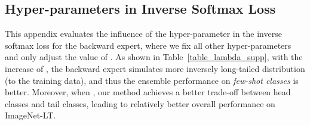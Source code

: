 \documentclass{article}
\begin{document}
\begin{table}[h]  
	\caption{Performance of our method with different numbers of experts   on  various      test class distributions  of ImageNet-LT.} 
	\label{table_agnostic_expert_number_supp} 
 \begin{center}
 \begin{threeparttable} 
	 \end{threeparttable}
	 \end{center}  
\end{table} 


 \newpage
\subsection{Hyper-parameters in Inverse Softmax Loss}
This appendix evaluates the influence of the hyper-parameter  in the   inverse softmax loss for the backward expert, where we fix all other hyper-parameters and only adjust the value of  . 
As shown in Table~\ref{table_lambda_supp}, with the increase of , the backward expert  simulates more inversely long-tailed distribution (to the training data),  and thus the ensemble performance  on \emph{few-shot classes} is better. Moreover, when , our method achieves a better trade-off between  head classes  and tail classes, leading to  relatively better overall performance on ImageNet-LT.
 
\end{document}
